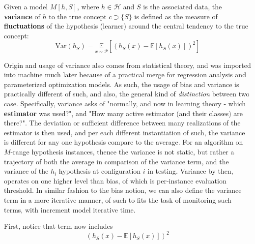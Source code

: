 \begin{definition}[Variance, I]
  Given a model $M[h,S]$, where $h\in\mathcal{H}$ and $S$ is the associated data, the \textbf{variance} of $h$ to the true concept $c\supset \{S\}$ is defined as the measure of \textbf{fluctuations} of the hypothesis (learner) around the central tendency to the true concept: 
  \begin{equation}
    \mathrm{Var}(h_S) = \underset{x\sim \mathcal{P}}{\mathbb{E}} \left[ (h_S(x) - \mathbb{E} [h_S (x)])^{2} \right] 
  \end{equation}
\end{definition}


Origin and usage of variance also comes from statistical theory, and was imported into machine much later because of a practical merge for regression analysis and parameterized optimization models. As such, the usage of bias and variance is practically different of such, and also, the general kind of \textit{distinction} between two case. Specifically, variance asks of "normally, and now in learning theory - which \textbf{estimator} was used?", and "How many active estimator (and their classes) are there?". The deviation or sufficient difference between many realizations of the estimator is then used, and per each different instantiation of such, the variance is different for any one hypothesis compare to the average. For an algorithm on $M$-range hypothesis instances, thence the variance is not static, but rather a trajectory of both the average in comparison of the variance term, and the variance of the $h_{i}$ hypothesis at configuration $i$ in testing. Variance by then, operates on one higher level than bias, of which is per-instance evaluation threshold. In similar fashion to the bias notion, we can also define the variance term in a more iterative manner, of such to fits the task of monitoring such terms, with increment model iterative time. 

First, notice that term now includes 
\begin{equation*}
  (h_S(x) - \mathbb{E} [h_S (x)])^{2}
\end{equation*}

